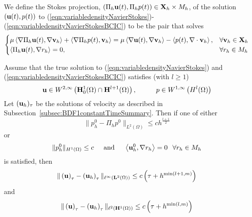 \documentclass[letterpaper]{erdc}
\begin{document}
We define the Stokes projection, $\left(\Pi_h\textbf{u}(t),\Pi_h p(t)\right) \in \textbf{X}_h\times M_h$, of the solution $\left(\textbf{u}(t),p(t)\right)$ to (\ref{eqn:variabledensityNavierStokes})-(\ref{eqn:variabledensityNavierStokesBCIC}) to be the pair that solves
\begin{equation}
  \begin{cases}
    \mu\left\langle \nabla\Pi_h\textbf{u}(t), \nabla\textbf{v}_h \right\rangle + \left\langle \nabla\Pi_h p(t), \textbf{v}_h \right\rangle = \mu\left\langle \nabla \textbf{u}(t), \nabla\textbf{v}_h \right\rangle - \left\langle p(t), \nabla\cdot\textbf{v}_h \right\rangle, & \forall \textbf{v}_h \in \textbf{X}_h\\
    \left\langle \Pi_h \textbf{u}(t), \nabla r_h \right\rangle = 0, & \forall r_h\in M_h
  \end{cases}
\end{equation}

\begin{theorem}
  Assume that the true solution to (\ref{eqn:variabledensityNavierStokes}) and (\ref{eqn:variabledensityNavierStokesBCIC}) satisfies (with $l\geq 1$)
  \begin{equation}
    \textbf{u}\in W^{2,\infty}\left(\mathbf{H}_0^1(\Omega)\cap \mathbf{H}^{l+1}(\Omega)\right), \hspace{1cm} p\in W^{1,\infty}\left(H^{l}(\Omega) \right)
  \end{equation}
  Let $(\textbf{u}_h)_{\tau}$ be the solutions of velocity as described in Subsection~\ref{subsec:BDF1constantTimeSummary}.  Then if one of either
  \begin{equation}
    \|p_h^0 - \Pi_h p^0 \|_{L^2(\Omega)} \leq c h^{\frac{l+1}{2}}
  \end{equation}
  or
  \begin{equation}
    \|p_h^0\|_{H^1(\Omega)} \leq c \hspace{0.5cm} \mbox{and} \hspace{0.5cm} \left\langle \textbf{u}_h^0, \nabla r_h \right\rangle = 0 \hspace{0.25cm} \forall r_h\in M_h
  \end{equation}
  is satisfied, then
  \begin{equation}
    \|\left(\textbf{u}\right)_\tau - \left(\textbf{u}_h\right)_{\tau} \|_{\ell^{\infty}(\mathbf{L}^2(\Omega))} \leq c\left( \tau + h^{\min(l+1,m)} \right)
  \end{equation}
  and
  \begin{equation}
    \|\left(\textbf{u}\right)_\tau - \left(\textbf{u}_h\right)_{\tau} \|_{\ell^{2}(\mathbf{H}^1(\Omega))} \leq c\left( \tau + h^{\min(l,m)} \right)
  \end{equation}
\end{theorem}
\end{document}
